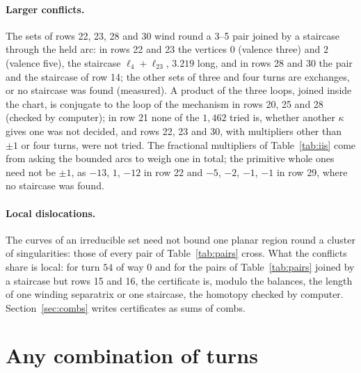 \documentclass[11pt,a4paper]{article}
\begin{document}
\paragraph{Larger conflicts.}
The sets of rows 22, 23, 28 and 30 wind round a 3--5 pair joined by a
staircase through the held arc: in rows 22 and 23 the vertices $0$ (valence
three) and $2$ (valence five), the staircase $\ell_4 + \ell_{23}$, $3.219$
long, and in rows 28 and 30 the pair and the staircase of row 14; the other
sets of three and four turns are exchanges, or no staircase was found
(measured). A product of the three loops, joined inside the chart, is
conjugate to the loop of the mechanism in rows 20, 25 and 28 (checked by
computer); in row 21 none of the $1{,}462$ tried is, whether another
$\kappa$ gives one was not decided, and rows 22, 23 and 30, with multipliers other than $\pm1$ or four
turns, were not tried. The fractional multipliers of Table~\ref{tab:iis} come from
asking the bounded arcs to weigh one in total; the primitive whole ones need
not be $\pm1$, as $-13$, $1$, $-12$ in row 22 and $-5$, $-2$, $-1$, $-1$ in
row 29, where no staircase was found.

\paragraph{Local dislocations.}
The curves of an irreducible set need not bound one planar region round a
cluster of singularities: those of every pair of Table~\ref{tab:pairs} cross.
What the conflicts share is local: for turn $54$ of way 0 and for the pairs of
Table~\ref{tab:pairs} joined by a staircase but rows 15 and 16, the
certificate is, modulo the balances, the length of one winding separatrix or
one staircase, the homotopy checked by computer. Section~\ref{sec:combs}
writes certificates as sums of combs.

\section{Any combination of turns}\label{sec:fox}
\end{document}
